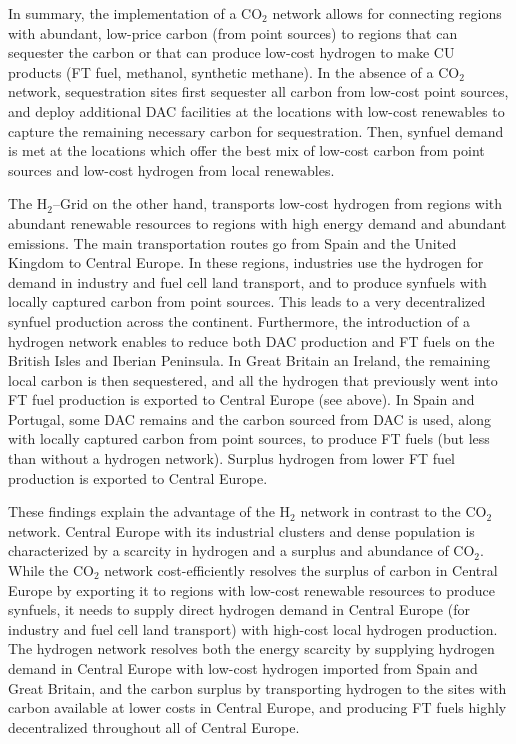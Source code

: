\documentclass[twocolumn]{article}
\newcommand{\carbon}{CO$_2$}
\newcommand{\hydrogen}{H$_2$}
\newcommand{\hydrogengrid}{\hydrogen{}--Grid}
\begin{document}
In summary, the implementation of a \carbon{} network allows for connecting regions with abundant, low-price carbon (from point sources) to regions that can sequester the carbon or that can produce low-cost hydrogen to make CU products (FT fuel, methanol, synthetic methane). In the absence of a \carbon{} network, sequestration sites first sequester all carbon from low-cost point sources, and deploy additional DAC facilities at the locations with low-cost renewables to capture the remaining necessary carbon for sequestration. Then, synfuel demand is met at the locations which offer the best mix of low-cost carbon from point sources and low-cost hydrogen from local renewables.

The \hydrogengrid{} on the other hand, transports low-cost hydrogen from regions with abundant renewable resources to regions with high energy demand and abundant emissions. The main transportation routes go from Spain and the United Kingdom to Central Europe. In these regions, industries use the hydrogen for demand in industry and fuel cell land transport, and to produce synfuels with locally captured carbon from point sources. This leads to a very decentralized synfuel production across the continent. Furthermore, the introduction of a hydrogen network enables to reduce both DAC production and FT fuels on the British Isles and Iberian Peninsula. In Great Britain an Ireland, the remaining local carbon is then sequestered, and all the hydrogen that previously went into FT fuel production is exported to Central Europe (see above). In Spain and Portugal, some DAC remains and the carbon sourced from DAC is used, along with locally captured carbon from point sources, to produce FT fuels (but less than without a hydrogen network). Surplus hydrogen from lower FT fuel production is exported to Central Europe.


These findings explain the advantage of the \hydrogen{} network in contrast to the \carbon{} network. Central Europe with its industrial clusters and dense population is characterized by a scarcity in hydrogen and a surplus and abundance of \carbon. While the \carbon{} network cost-efficiently resolves the surplus of carbon in Central Europe by exporting it to regions with low-cost renewable resources to produce synfuels, it needs to supply direct hydrogen demand in Central Europe (for industry and fuel cell land transport) with high-cost local hydrogen production. The hydrogen network resolves both the energy scarcity by supplying hydrogen demand in Central Europe with low-cost hydrogen imported from Spain and Great Britain, and the carbon surplus by transporting hydrogen to the sites with carbon available at lower costs in Central Europe, and producing FT fuels highly decentralized throughout all of Central Europe.
\end{document}

